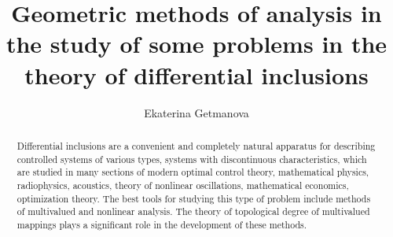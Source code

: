 \begin{englishtitle} %
\title{Geometric methods of analysis in the study of some problems in the theory of differential inclusions}
\author{Ekaterina Getmanova
}
\maketitle

\begin{abstract}
Differential inclusions are a convenient and completely natural apparatus for describing controlled systems of various types, systems with discontinuous characteristics, which are studied in many sections of modern optimal control theory, mathematical physics, radiophysics, acoustics, theory of nonlinear oscillations, mathematical economics, optimization theory. The best tools for studying this type of problem include methods of multivalued and nonlinear analysis. The theory of topological degree of multivalued mappings plays a significant role in the development of these methods.



\end{abstract}
\end{englishtitle}


\iffalse
%
%


\documentclass[12pt]{llncs}


\usepackage{iftex}

\ifPDFTeX
\usepackage[T2A]{fontenc}
\usepackage[utf8]{inputenc} %
\usepackage[english,russian]{babel}
\fi

